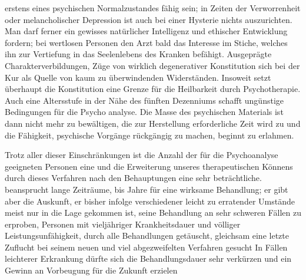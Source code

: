 \documentclass[twoside=true,titlepage=false,open=any, parskip=never, fontsize=10pt, headings=small, chapterprefix=false, appendixprefix=false]{scrbook}
\begin{document}
 erstens eines psychischen Normalzustandes fähig sein; in Zeiten
 der Verworrenheit oder
               melancholischer Depression ist auch bei
 einer Hysterie nichts auszurichten. Man
               darf ferner ein gewisses
 natürlicher Intelligenz und ethischer Entwicklung fordern;
 bei wertlosen
               Personen  den Arzt bald das Interesse im
 Stiche, welches ihn zur Vertiefung in das
               Seelenlebens des
 Kranken befähigt. Ausgeprägte Charakterverbildungen, Züge
               von
 wirklich degenerativer Konstitution  sich bei der Kur als
 Quelle von kaum zu überwindenden Widerständen.
               Insoweit setzt
 überhaupt die Konstitution eine Grenze für die Heilbarkeit
               durch
 Psychotherapie. Auch eine Altersstufe in der Nähe des fünften
               Dezenniums schafft ungünstige Bedingungen für die Psycho
analyse. Die
               Masse des psychischen Materials ist dann nicht
 mehr zu bewältigen, die zur
               Herstellung erforderliche Zeit wird
 zu  und die Fähigkeit, psychische Vorgänge rückgängig zu
 machen, beginnt zu
               erlahmen.
        \pend
    




        \pstart
        Trotz aller dieser Einschränkungen ist die Anzahl der für die
 Psychoanalyse
               geeigneten Personen eine und die Erweiterung unseres therapeutischen Könnens durch
 dieses
               Verfahren nach den Behauptungen  eine sehr
 beträchtliche. 
               beansprucht lange Zeiträume,  bis  Jahre für eine wirksame Behandlung; er gibt aber die
 Auskunft,  er bisher infolge verschiedener leicht zu erratender
 Umstände meist nur
               in die Lage gekommen ist, seine Behandlung
 an sehr schweren Fällen zu erproben,
               Personen mit vieljähriger
 Krankheitsdauer und völliger Leistungsunfähigkeit,  durch alle
 Behandlungen getäuscht, gleichsam eine letzte Zuflucht bei
               seinem
 neuen und viel abgezweifelten Verfahren gesucht  In
 Fällen leichterer Erkrankung dürfte sich die Behandlungsdauer
               sehr verkürzen und ein  Gewinn an Vorbeugung
 für die Zukunft erzielen 
\end{document}
